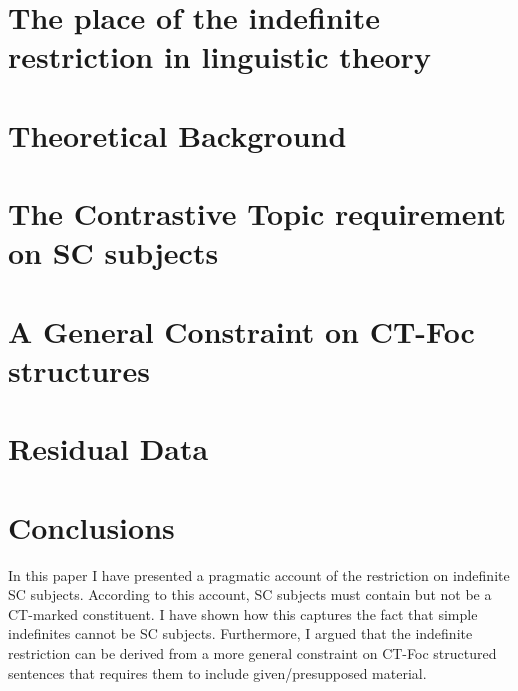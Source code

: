\documentclass[letterpaper]{article}
\begin{document}
\section{The place of the indefinite restriction in linguistic theory}\label{sec:LitReview}

\section{Theoretical Background}\label{sec:TheoryBackground}

\section{The Contrastive Topic requirement on SC subjects}\label{sec:MainArgument}

\section{A General Constraint on CT-Foc structures}

\section{Residual Data}\label{sec:Leftovers}

\section{Conclusions}\label{sec:Conclusion}
In this paper I have presented a pragmatic account of the restriction on indefinite SC subjects.
According to this account, SC subjects must contain but not be a CT-marked constituent.
I have shown how this captures the fact that simple indefinites cannot be SC subjects.
Furthermore, I argued that the indefinite restriction can be derived from a more general constraint on CT-Foc structured sentences that requires them to include given/presupposed material.

\printbibliography
\end{document}

